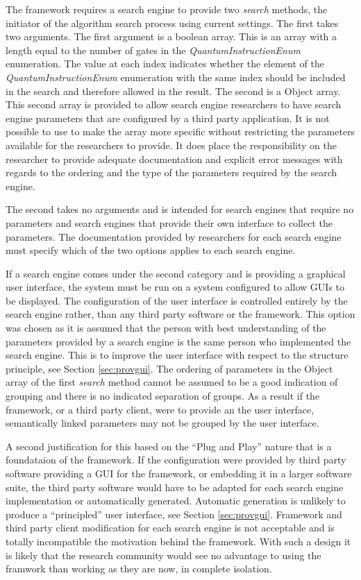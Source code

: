 The framework requires a search engine to provide two \emph{search} methods, the initiator of the algorithm search process using current settings.
The first takes two arguments.
The first argument is a boolean array.
This is an array with a length equal to the number of gates in the \emph{QuantumInstructionEnum} enumeration.
The value at each index indicates whether the element of the \emph{QuantumInstructionEnum} enumeration with the same index should be included in the search and therefore allowed in the result.
The second is a Object array.
This second array is provided to allow search engine researchers to have search engine parameters that are configured by a third party application.
It is not possible to use to make the array more specific without restricting the parameters available for the researchers to provide.
It does place the responsibility on the researcher to provide adequate documentation and explicit error messages with regards to the ordering and the type of the parameters required by the search engine.

The second takes no arguments and is intended for search engines that require no parameters and search engines that provide their own interface to collect the parameters.
The documentation provided by researchers for each search engine must specify which of the two options applies to each search engine.

If a search engine comes under the second category and is providing a graphical user interface, the system must be run on a system configured to allow GUIs to be displayed.
The configuration of the user interface is controlled entirely by the search engine rather, than any third party software or the framework.
This option was chosen as it is assumed that the person with best understanding of the parameters provided by a search engine is the same person who implemented the search engine.
This is to improve the user interface with respect to the structure principle, see Section \ref{sec:provgui}.
The ordering of parameters in the Object array of the first \emph{search} method cannot be assumed to be a good indication of grouping and there is no indicated separation of groups.
As a result if the framework, or a third party client, were to provide an the user interface, semantically linked parameters may not be grouped by the user interface.

A second justification for this based on the ``Plug and Play'' nature that is a foundataion of the framework.
If the configuration were provided by third party software providing a GUI for the framework, or embedding it in a larger software suite, the third party software would have to be adapted for each search engine implementation or automatically generated.
Automatic generation is unlikely to produce a ``principled'' user interface, see Section \ref{sec:provgui}.
Framework and third party client modification for each search engine is not acceptable and is totally incompatible the motivation behind the framework.
With such a design it is likely that the research community would see no advantage to using the framwork than working as they are now, in complete isolation.

